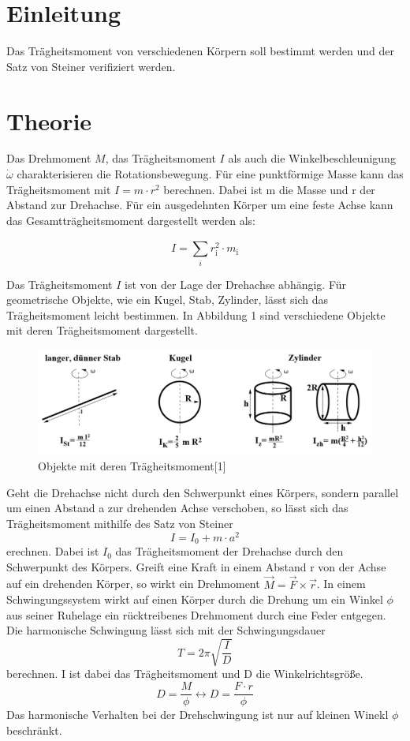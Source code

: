 \section{Einleitung}
Das Trägheitsmoment von verschiedenen Körpern soll bestimmt werden und der Satz von Steiner verifiziert werden.
\section{Theorie}
Das Drehmoment $M$, das Trägheitsmoment $I$ als auch die Winkelbeschleunigung $\dot{\omega}$ charakterisieren die Rotationsbewegung.
Für eine punktförmige Masse kann das Trägheitsmoment mit $I = m\cdot r^2$ berechnen. Dabei ist m die Masse und r der Abstand zur Drehachse.
Für ein ausgedehnten Körper um eine feste Achse kann das Gesamtträgheitsmoment dargestellt werden als:

\begin{equation}
  I=\sum \limits_{i}^{} r_\text{i}^2 \cdot m_\text{i}
\end{equation}

Das Trägheitsmoment $I$ ist von der Lage der Drehachse abhängig.
Für geometrische Objekte, wie ein Kugel, Stab, Zylinder, lässt sich das Trägheitsmoment
leicht bestimmen.
In Abbildung 1 sind verschiedene Objekte mit deren Trägheitsmoment dargestellt.
\begin{figure}[H]
\centering
\includegraphics[width=\textwidth]{Bild1.jpg}
\caption{Objekte mit deren Trägheitsmoment[1]}
\label{fig:Abb1}
\end{figure}
Geht die Drehachse nicht durch den Schwerpunkt eines Körpers, sondern parallel um einen Abstand a
zur drehenden Achse verschoben, so lässt sich das Trägheitsmoment mithilfe des Satz von Steiner
\begin{equation}
  I = I_\text{0} + m\cdot a^2
\end{equation}
erechnen. Dabei ist $I_\text{0}$ das Trägheitsmoment der Drehachse durch den Schwerpunkt des Körpers.
Greift eine Kraft in einem Abstand r von der Achse auf ein drehenden Körper, so wirkt ein Drehmoment $\vec{M} = \vec{F} \times \vec{r}$.
In einem Schwingungssystem wirkt auf einen Körper durch die Drehung um ein Winkel $\phi$ aus seiner Ruhelage ein rücktreibenes Drehmoment
durch eine Feder entgegen. Die harmonische Schwingung lässt sich mit der Schwingungsdauer
\begin{equation}
  T = 2\pi \sqrt{\frac{I}{D}}
\end{equation}
berechnen. I ist dabei das Trägheitsmoment und D die Winkelrichtsgröße.
\begin{equation}
  D = \frac{M}{\phi} \leftrightarrow D = \frac{F \cdot r}{\phi}
\end{equation}
Das harmonische Verhalten bei der Drehschwingung ist nur auf kleinen Winekl $\phi$
beschränkt.
